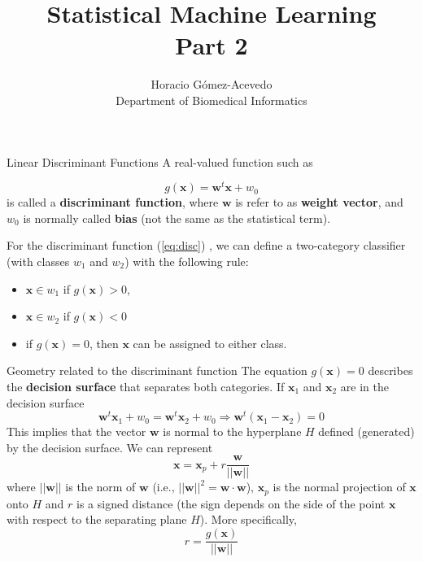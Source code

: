 \documentclass{beamer}
\title{Statistical Machine Learning\\ Part 2}
\author{Horacio G\'omez-Acevedo\\ Department of Biomedical Informatics}
\begin{document}
	\begin{frame}[plain]
		\maketitle
	\end{frame}
	\begin{frame}{Linear Discriminant Functions}
		A real-valued  function such as 
	
		\begin{equation}
			g(\mathbf{x})=\mathbf{w}^t \mathbf{x} +w_0	
			\label{eq:disc}
	\end{equation}	
	is called a {\bf discriminant function},
	where $\mathbf{w}$ is refer to as {\bf weight vector}, and  $w_0$  is normally called {\bf bias} (not the same as the statistical term). 
	
	For the discriminant function (\ref{eq:disc}) , we can define a two-category classifier (with classes $w_1$ and $w_2$) with the following rule:
	\begin{itemize}
		\item $\mathbf{x}\in w_1$ if $g(\mathbf{x}) >0$,
		\item $\mathbf{x}\in w_2$ if $g(\mathbf{x}) <0$
		\item if $g(\mathbf{x})=0$, then $\mathbf{x}$ can be assigned to either class.
	\end{itemize}
\end{frame}

\begin{frame}{Geometry related to the discriminant function}
	The equation $g(\mathbf{x})=0$ describes the {\bf decision surface} that separates both categories. If $\mathbf{x}_1$ and $\mathbf{x}_2$ are in the decision surface
	\begin{equation*}
		\mathbf{w}^t \mathbf{x}_1+w_0= \mathbf{w}^t \mathbf{x}_2+ w_0 \Rightarrow \mathbf{w}^t (\mathbf{x}_1 - \mathbf{x}_2)=0
	\end{equation*}
This implies that the vector $\mathbf{w}$ is normal to the hyperplane $H$ defined (generated) by the decision surface.
We can represent 
\begin{equation*}
	\mathbf{x}= \mathbf{x}_p+ r \frac{\mathbf{w}}{||\mathbf{w}||}
\end{equation*}
where $||\mathbf{w}||$ is the norm of $\mathbf{w}$ (i.e., $||\mathbf{w}||^2=\mathbf{w} \cdot \mathbf{w}$), $\mathbf{x}_p$ is the normal projection of $\mathbf{x}$ onto $H$ and $r$ is a signed distance (the sign depends on the side of the point $\mathbf{x}$ with respect to the separating plane $H$). More specifically,
\begin{equation*}
	r= \frac{g(\mathbf{x})}{||\mathbf{w}||}
\end{equation*}
\end{frame}
\end{document}
